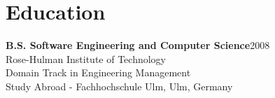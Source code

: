 \section{Education}

{\bf B.S. Software Engineering and Computer Science}\hfill 2008\\
Rose-Hulman Institute of Technology\\
Domain Track in Engineering Management \\
Study Abroad - Fachhochschule Ulm, Ulm, Germany
